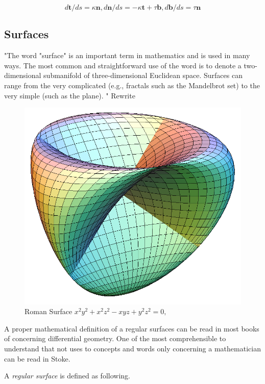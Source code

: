 \begin{equation}
d\textbf{t}/ds = \kappa \textbf{n}, d\textbf{n}/ds = - \kappa \textbf{t} + \tau \textbf{b}, d\textbf{b}/ds = \tau \textbf{n}
\end{equation}

\subsection{Surfaces}

"The word "surface" is an important term in mathematics and is used in many ways. The most common and straightforward use of the word is to denote a two-dimensional submanifold of three-dimensional Euclidean space. Surfaces can range from the very complicated (e.g., fractals such as the Mandelbrot set) to the very simple (such as the plane). " Rewrite

\begin{figure}[H]
\centering
\includegraphics[width=0.5\linewidth]{figure/Theory/Romansurface.png}
 
\caption{Roman Surface $ x^2 y^2+x^2 z^2-x y z+y^2 z^2 = 0,$  }
\end{figure}


A proper mathematical definition of a regular surfaces can be read in most books of concerning differential geometry. One of the most comprehensible to understand that not uses to concepts and words only concerning a mathematician can be read in Stoke.

A \textit{regular surface} is defined as following.

